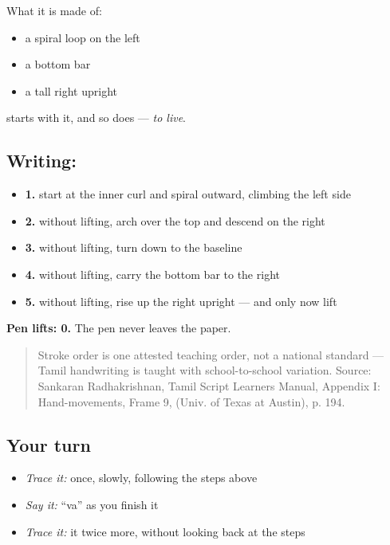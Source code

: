 What it is made of:

\begin{itemize}
\raggedright
  \item a spiral loop on the left
  \item a bottom bar
  \item a tall right upright
\end{itemize}

 starts with it, and so does  — \emph{to live}.

\subsection*{Writing: }

\begin{itemize}
\raggedright
  \item \textbf{1.} start at the inner curl and spiral outward, climbing the left side
  \item \textbf{2.} without lifting, arch over the top and descend on the right
  \item \textbf{3.} without lifting, turn down to the baseline
  \item \textbf{4.} without lifting, carry the bottom bar to the right
  \item \textbf{5.} without lifting, rise up the right upright — and only now lift
\end{itemize}

\textbf{Pen lifts: 0.} The pen never leaves the paper.

\begin{quote}
Stroke order is one attested teaching order, not a national standard — Tamil handwriting is taught with school-to-school variation. Source: Sankaran Radhakrishnan, Tamil Script Learners Manual, Appendix I: Hand-movements, Frame 9,  (Univ. of Texas at Austin), p. 194.
\end{quote}

\subsection*{Your turn}
\begin{itemize}
\raggedright
  \item \emph{Trace it:}  once, slowly, following the steps above
  \item \emph{Say it:} \textquotedblleft{}va\textquotedblright{} as you finish it
  \item \emph{Trace it:} it twice more, without looking back at the steps
\end{itemize}

